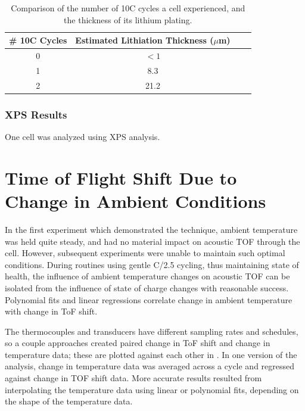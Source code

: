 \begin{table}[h]
    \centering
    \begin{tabular}{c|c|c|c}
         \# 10C Cycles & Estimated Lithiation Thickness ($\mu$m) \\
         \hline
         0 & $<1$ \\
         1 & 8.3 \\
         2 & 21.2 \\
    \end{tabular}
    \caption{Comparison of the number of 10C cycles a cell experienced, and the thickness of its lithium plating.}
    \label{tab:plating}
\end{table}


\subsubsection{XPS Results}
One cell was analyzed using XPS analysis.


\section{Time of Flight Shift Due to Change in Ambient Conditions}
In the first experiment which demonstrated the technique, ambient temperature was held quite steady, and had no material impact on acoustic TOF through the cell. 
However, subsequent experiments were unable to maintain such optimal conditions.
During routines using gentle C/2.5 cycling, thus maintaining state of health, the influence of ambient temperature changes on acoustic TOF can be isolated from the influence of state of charge changes with reasonable success. 
Polynomial fits and linear regressions correlate change in ambient temperature with change in ToF shift. 

The thermocouples and transducers have different sampling rates and schedules, so a couple approaches created paired change in ToF shift and change in temperature data; these are plotted against each other in . 
In one version of the analysis, change in temperature data was averaged across a cycle and regressed against change in TOF shift data. 
More accurate results resulted from interpolating the temperature data using linear or polynomial fits, depending on the shape of the temperature data.

